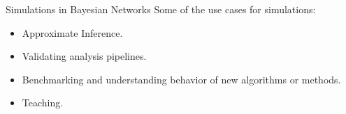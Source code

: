 \documentclass{beamer}
\begin{document}

\begin{frame}{Simulations in Bayesian Networks}
	Some of the use cases for simulations:
	\begin{itemize}
		\item Approximate Inference.
		\item Validating analysis pipelines.
		\item Benchmarking and understanding behavior of new algorithms or methods.
		\item Teaching.
	\end{itemize}
\end{frame}
\end{document}
